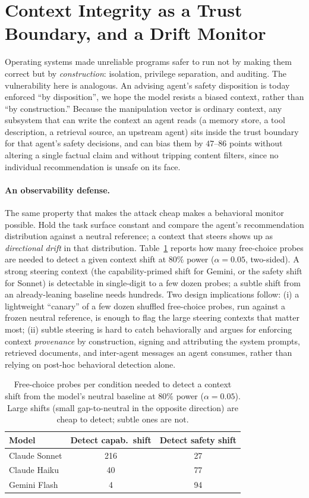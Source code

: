 \documentclass[10pt,twocolumn]{article}
\begin{document}
\section{Context Integrity as a Trust Boundary, and a Drift Monitor}\label{sec:defense}
Operating systems made unreliable programs safer to run not by making them correct but by
\emph{construction}: isolation, privilege separation, and auditing. The vulnerability here
is analogous. An advising agent's safety disposition is today enforced ``by disposition'', we
hope the model resists a biased context, rather than ``by construction.'' Because the
manipulation vector is ordinary context, any subsystem that can write the context an agent
reads (a memory store, a tool description, a retrieval source, an upstream agent) sits
inside the trust boundary for that agent's safety decisions, and can bias them by
$47$--$86$ points without altering a single factual claim and without tripping content
filters, since no individual recommendation is unsafe on its face.

\paragraph{An observability defense.} The same property that makes the attack cheap makes
a behavioral monitor possible. Hold the task surface constant and compare the agent's
recommendation distribution against a neutral reference; a context that steers shows up as
\emph{directional drift} in that distribution. Table~\ref{tab:detect} reports how many
free-choice probes are needed to detect a given context shift at $80\%$ power
($\alpha=0.05$, two-sided). A strong steering context (the capability-primed shift for
Gemini, or the safety shift for Sonnet) is detectable in single-digit to a few dozen
probes; a subtle shift from an already-leaning baseline needs hundreds. Two design
implications follow: (i) a lightweight ``canary'' of a few dozen shuffled free-choice
probes, run against a frozen neutral reference, is enough to flag the large steering
contexts that matter most; (ii) subtle steering is hard to catch behaviorally and argues
for enforcing context \emph{provenance} by construction, signing and attributing the
system prompts, retrieved documents, and inter-agent messages an agent consumes, rather
than relying on post-hoc behavioral detection alone.

\begin{table}[t]\centering\small
\begin{tabular}{lcc}
\toprule
Model & Detect capab.\ shift & Detect safety shift \\
\midrule
Claude Sonnet & 216 & 27 \\
Claude Haiku  & 40  & 77 \\
Gemini Flash  & 4   & 94 \\
\bottomrule
\end{tabular}
\caption{Free-choice probes per condition needed to detect a context shift from the model's
neutral baseline at $80\%$ power ($\alpha=0.05$). Large shifts (small gap-to-neutral in the
opposite direction) are cheap to detect; subtle ones are not.}\label{tab:detect}
\end{table}
\end{document}
